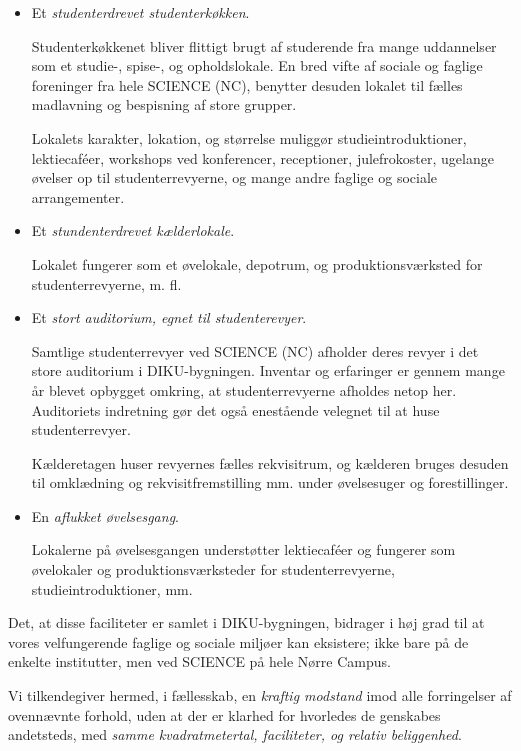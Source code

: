 \documentclass[a4paper]{article}
\begin{document}
\begin{itemize}

\item Et \emph{studenterdrevet studenterkøkken}.

  Studenterkøkkenet bliver flittigt brugt af studerende fra mange
  uddannelser som et studie-, spise-, og opholdslokale. En bred vifte
  af sociale og faglige foreninger fra hele SCIENCE (NC), benytter
  desuden lokalet til fælles madlavning og bespisning af store
  grupper.

  Lokalets karakter, lokation, og størrelse muliggør
  studieintroduktioner, lektiecaféer, workshops ved konferencer,
  receptioner, julefrokoster, ugelange øvelser op til
  studenterrevyerne, og mange andre faglige og sociale arrangementer.

\item Et \emph{stundenterdrevet kælderlokale}.

  Lokalet fungerer som et øvelokale, depotrum, og produktionsværksted
  for studenterrevyerne, m. fl.

\item Et \emph{stort auditorium, egnet til studenterevyer}.

  Samtlige studenterrevyer ved SCIENCE (NC) afholder deres revyer i
  det store auditorium i DIKU-bygningen. Inventar og erfaringer er
  gennem mange år blevet opbygget omkring, at studenterrevyerne
  afholdes netop her. Auditoriets indretning gør det også enestående
  velegnet til at huse studenterrevyer.

  Kælderetagen huser revyernes fælles rekvisitrum, og kælderen bruges desuden
  til omklædning og rekvisitfremstilling mm. under øvelsesuger og
  forestillinger.

\item En \emph{aflukket øvelsesgang}.

Lokalerne på øvelsesgangen understøtter lektiecaféer og fungerer som
øvelokaler og produktionsværksteder for studenterrevyerne,
studieintroduktioner, mm.

\end{itemize}

Det, at disse faciliteter er samlet i DIKU-bygningen, bidrager i høj
grad til at vores velfungerende faglige og sociale miljøer kan
eksistere; ikke bare på de enkelte institutter, men ved SCIENCE på
hele Nørre Campus.

Vi tilkendegiver hermed, i fællesskab, en \emph{kraftig modstand} imod
alle forringelser af ovennævnte forhold, uden at der er klarhed for
hvorledes de genskabes andetsteds, med \emph{samme kvadratmetertal,
  faciliteter, og relativ beliggenhed}.
\end{document}
